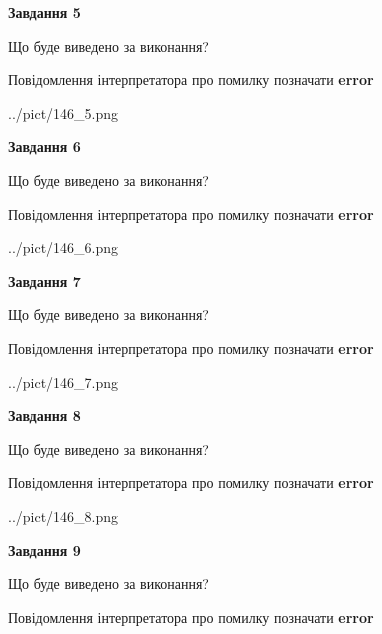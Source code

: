 \documentclass[11pt, ukrainian]{article}
\begin{document}
{\begin {large}
{\begin {center}\textbf{Завдання 5}\end {center}}\par
Що буде виведено за виконання? \par
Повідомлення інтерпретатора про помилку позначати \textbf{error}

\begin{center}
	{../pict/146_5.png}
\end{center}
\newpage

{\begin {center}\textbf{Завдання 6}\end {center}}\par
Що буде виведено за виконання? \par
Повідомлення інтерпретатора про помилку позначати \textbf{error}

\begin{center}
	{../pict/146_6.png}
\end{center}
\newpage

{\begin {center}\textbf{Завдання 7}\end {center}}\par
Що буде виведено за виконання? \par
Повідомлення інтерпретатора про помилку позначати \textbf{error}

\begin{center}
	{../pict/146_7.png}
\end{center}
\newpage

{\begin {center}\textbf{Завдання 8}\end {center}}\par
Що буде виведено за виконання? \par
Повідомлення інтерпретатора про помилку позначати \textbf{error}

\begin{center}
	{../pict/146_8.png}
\end{center}
\newpage

{\begin {center}\textbf{Завдання 9}\end {center}}\par
Що буде виведено за виконання? \par
Повідомлення інтерпретатора про помилку позначати \textbf{error}


\end{large}}
\end{document}
